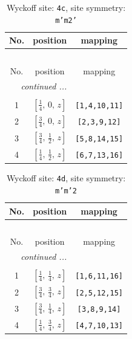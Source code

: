 \documentclass[fleqn,8pt]{jsarticle}
\begin{document}
\renewcommand{\arraystretch}{1.2}
\begin{longtable}{ccc}
\caption{Wyckoff site: {\tt 4c}, site symmetry: {\tt m'm2'}}
 \\
 \hline \hline
No. & position & mapping \\ \hline \endfirsthead

\multicolumn{2}{l}{\tablename\ \thetable{}} \\
 \hline \hline
No. & position & mapping \\ \hline \endhead

 \hline \hline
\multicolumn{2}{r}{\footnotesize\it continued ...} \\ \endfoot

 \hline \hline
\multicolumn{2}{r}{} \\ \endlastfoot

1 & $\left[ \frac{1}{4},\, 0,\, z \right]$ & {\tt [1,4,10,11]} \\ \hline
2 & $\left[ \frac{3}{4},\, 0,\, z \right]$ & {\tt [2,3,9,12]} \\ \hline
3 & $\left[ \frac{3}{4},\, \frac{1}{2},\, z \right]$ & {\tt [5,8,14,15]} \\ \hline
4 & $\left[ \frac{1}{4},\, \frac{1}{2},\, z \right]$ & {\tt [6,7,13,16]} \\
\end{longtable}
\renewcommand{\arraystretch}{1.2}
\begin{longtable}{ccc}
\caption{Wyckoff site: {\tt 4d}, site symmetry: {\tt m'm'2}}
 \\
 \hline \hline
No. & position & mapping \\ \hline \endfirsthead

\multicolumn{2}{l}{\tablename\ \thetable{}} \\
 \hline \hline
No. & position & mapping \\ \hline \endhead

 \hline \hline
\multicolumn{2}{r}{\footnotesize\it continued ...} \\ \endfoot

 \hline \hline
\multicolumn{2}{r}{} \\ \endlastfoot

1 & $\left[ \frac{1}{4},\, \frac{1}{4},\, z \right]$ & {\tt [1,6,11,16]} \\ \hline
2 & $\left[ \frac{3}{4},\, \frac{3}{4},\, z \right]$ & {\tt [2,5,12,15]} \\ \hline
3 & $\left[ \frac{3}{4},\, \frac{1}{4},\, z \right]$ & {\tt [3,8,9,14]} \\ \hline
4 & $\left[ \frac{1}{4},\, \frac{3}{4},\, z \right]$ & {\tt [4,7,10,13]} \\
\end{longtable}
\end{document}
